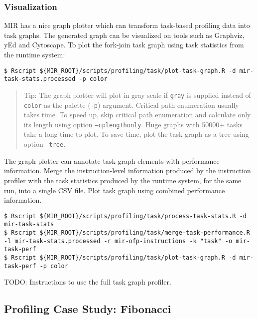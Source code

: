 \documentclass[11pt,a4paper]{article}
\begin{document}
\subsubsection{Visualization}

MIR has a nice graph plotter which can transform task-based profiling data into task graphs. The generated graph can be visualized on tools such as Graphviz, yEd and Cytoscape.  To plot the fork-join task graph using task statistics from the runtime system:

\begin{lstlisting}[style=MyInputStyle]
$ Rscript ${MIR_ROOT}/scripts/profiling/task/plot-task-graph.R -d mir-task-stats.processed -p color
\end{lstlisting}

\begin{framed}
\begin{quote}
Tip: The graph plotter will plot in gray scale if \texttt{gray} is supplied instead of \texttt{color} as the palette (\texttt{-p}) argument. Critical path enumeration usually takes time. To speed up, skip critical path enumeration and calculate only its length using option \texttt{--cplengthonly}. Huge graphs with 50000+ tasks take a long time to plot. To save time, plot the task graph as a tree using option \texttt{--tree}.
\end{quote}
\end{framed}

The graph plotter can annotate task graph elements with performance information. Merge the instruction-level information produced by the instruction profiler with the task statistics produced by the runtime system, for the same run, into a single CSV file. Plot task graph using combined performance information.

\begin{lstlisting}[style=MyInputStyle]
$ Rscript ${MIR_ROOT}/scripts/profiling/task/process-task-stats.R -d mir-task-stats
$ Rscript ${MIR_ROOT}/scripts/profiling/task/merge-task-performance.R -l mir-task-stats.processed -r mir-ofp-instructions -k "task" -o mir-task-perf
$ Rscript ${MIR_ROOT}/scripts/profiling/task/plot-task-graph.R -d mir-task-perf -p color
\end{lstlisting}

TODO: Instructions to use the full task graph profiler.

\subsection{Profiling Case Study: Fibonacci}
\end{document}
